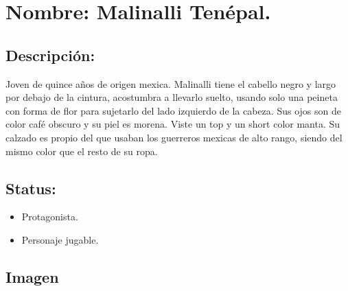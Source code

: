 \section{Nombre: Malinalli Tenépal.} \label{per:malinalli}
	\subsection{Descripción:}
Joven de quince años de origen mexica. Malinalli tiene el cabello negro y largo por debajo de la cintura, acostumbra a llevarlo suelto, usando solo una peineta con forma de flor para sujetarlo del lado izquierdo de la cabeza. Sus ojos son de color café obscuro y su piel es morena. Viste un top y un short color manta. Su calzado es propio del que usaban los guerreros mexicas de alto rango, siendo del mismo color que el resto de su ropa.  
\subsection{Status:}
	\begin{itemize}
		\item Protagonista.
		\item Personaje jugable.
	\end{itemize} 
\subsection{Imagen}
